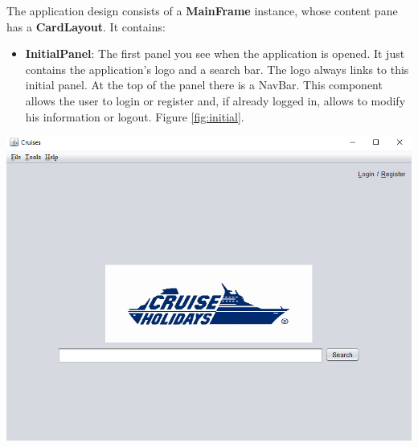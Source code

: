 \documentclass[11pt]{article}
\begin{document}
   	\begin{qn}
	The application design consists of a \textbf{MainFrame} instance, whose content pane has a \textbf{CardLayout}. It contains:
		\begin{itemize}
		    \item \textbf{InitialPanel}: The first panel you see when the application is opened. It just contains the application's  logo and a search bar. The logo always links to this initial panel. At the top of the panel there is a NavBar. This component allows the user to login or register and, if already logged in, allows to modify his information or logout. Figure \ref{fig:initial}.
		\end{itemize}
		\begin{center}
			\begin{minipage}{0.8\linewidth}
			   	\includegraphics[width=\linewidth]{images/initial.png}
			   	\label{fig:initial}
			\end{minipage}
		\end{center}
	\end{qn}
	
\end{document}
